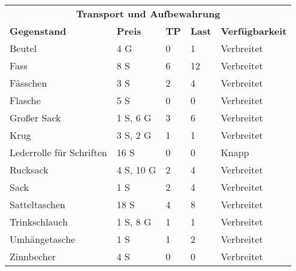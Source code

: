 \documentclass[a4paper, 9pt]{scrreprt}
\begin{document}
\begin{table}[!ht]
    \renewcommand{\arraystretch}{1.2}
    \begin{tabular}{lllll}
        \multicolumn{5}{c}{\cellcolor{gray!25}\textbf{Transport und Aufbewahrung}}                       \\
        \textbf{Gegenstand}      & \textbf{Preis} & \textbf{TP} & \textbf{Last} & \textbf{Verfügbarkeit} \\ \hline
        Beutel                   & 4 G            & 0           & 1             & Verbreitet             \\ \hline
        Fass                     & 8 S            & 6           & 12            & Verbreitet             \\ \hline
        Fässchen                 & 3 S            & 2           & 4             & Verbreitet             \\ \hline
        Flasche                  & 5 S            & 0           & 0             & Verbreitet             \\ \hline
        Großer Sack              & 1 S, 6 G       & 3           & 6             & Verbreitet             \\ \hline
        Krug                     & 3 S, 2 G       & 1           & 1             & Verbreitet             \\ \hline
        Lederrolle für Schriften & 16 S           & 0           & 0             & Knapp                  \\ \hline
        Rucksack                 & 4 S, 10 G      & 2           & 4             & Verbreitet             \\ \hline
        Sack                     & 1 S            & 2           & 4             & Verbreitet             \\ \hline
        Satteltaschen            & 18 S           & 4           & 8             & Verbreitet             \\ \hline
        Trinkschlauch            & 1 S, 8 G       & 1           & 1             & Verbreitet             \\ \hline
        Umhängetasche            & 1 S            & 1           & 2             & Verbreitet             \\ \hline
        Zinnbecher               & 4 S            & 0           & 0             & Verbreitet
    \end{tabular}%
\end{table}
\end{document}
